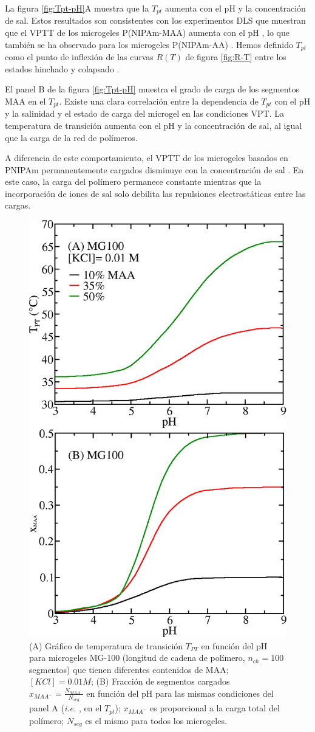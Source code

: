 La figura \ref{fig:Tpt-pH}A muestra que la $T_{pt}$ aumenta con el pH y la concentraci\'on de sal.
Estos resultados son consistentes con los experimentos DLS que muestran que el VPTT de los microgeles P(NIPAm-MAA) aumenta con el pH \cite{Kleinen2008}, lo que tambi\'en se ha observado para los microgeles P(NIPAm-AA) \cite{CaprilesGonzalez2008}.
Hemos definido $T_{pt}$ como el punto de inflexi\'on de las curvas $R(T)$ de figura \ref{fig:R-T} entre los estados hinchado y colapsado \cite{Kratz2001}.


El panel B de la figura \ref{fig:Tpt-pH} muestra el grado de carga de los segmentos MAA en el $T_{pt}$.
Existe una clara correlaci\'on entre la dependencia de $T_{pt}$ con el pH y la salinidad y el estado de carga del microgel en las condiciones VPT.
La temperatura de transici\'on aumenta con el pH y la concentraci\'on de sal, al igual que la carga de la red de pol\'imeros.

A diferencia de este comportamiento, el VPTT de los microgeles basados en PNIPAm permanentemente cargados disminuye con la concentraci\'on de sal \cite{Lopez2020}.
En este caso, la carga del pol\'imero permanece constante mientras que la incorporaci\'on de iones de sal solo debilita las repulsiones electrost\'aticas entre las cargas.


\begin{figure}[!tb]
	\centering
	\includegraphics[width=0.5\linewidth]{Figures/graph-gel/Tpt-pH_MAA.png}
	\caption{(A) Gr\'afico de temperatura de transici\'on $T_{PT}$ en funci\'on del pH para microgeles MG-100 (longitud de cadena de pol\'imero, $n_{ch}=100$ segmentos) que tienen diferentes contenidos de MAA; $[KCl]=0.01 M$;
	(B) Fracci\'on de segmentos cargados $x_{MAA^-}=\frac{N_{MAA^-}}{N_{seg}}$ en funci\'on del pH para las mismas condiciones del panel A (\emph{i.e.} , en el $T_{pt}$); $x_{MAA^-}$ es proporcional a la carga total del pol\'imero; $N_{seg}$ es el mismo para todos los microgeles.}
	\label{fig:Tpt_MAA}
\end{figure}


